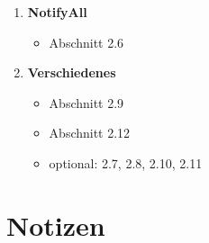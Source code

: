 \begin{tcolorbox}[colback=white!20,color=white]
\begin{enumerate}
        \item \textbf{NotifyAll}
        \begin{itemize}
            \item[] Abschnitt 2.6
        \end{itemize}

        \item \textbf{Verschiedenes}
        \begin{itemize}
            \item[] Abschnitt 2.9
            \item[] Abschnitt 2.12
            \item[] optional: 2.7, 2.8, 2.10, 2.11
        \end{itemize}
    \end{enumerate}
\end{tcolorbox}

\newpage







\newpage
\section*{Notizen}

\newpage


